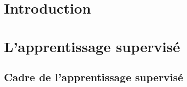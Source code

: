 \documentclass[10pt]{beamer}
\begin{document}
\section*{Introduction}

\section*{L'apprentissage supervisé}


\subsection*{Cadre de l'apprentissage supervisé}





%
%		
%		
%		
%		
%		
\end{document}

